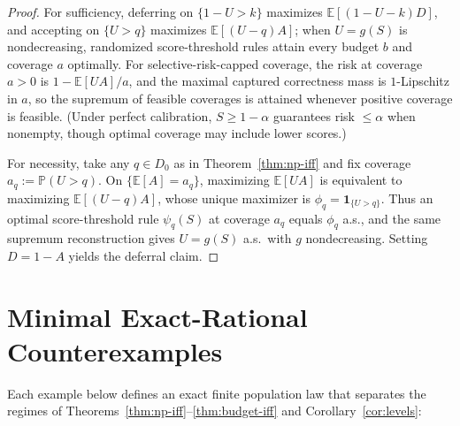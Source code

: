 \documentclass[11pt]{article}
\theoremstyle{plain}
\theoremstyle{definition}
\theoremstyle{remark}
\begin{document}
\begin{proof}
For sufficiency, deferring on $\{1 - U > k\}$ maximizes $\mathbb{E}[(1 - U - k)D]$, and accepting on $\{U > q\}$ maximizes $\mathbb{E}[(U - q)A]$; when $U = g(S)$ is nondecreasing, randomized score-threshold rules attain every budget $b$ and coverage $a$ optimally. For selective-risk-capped coverage, the risk at coverage $a > 0$ is $1 - \mathbb{E}[UA]/a$, and the maximal captured correctness mass is $1$-Lipschitz in $a$, so the supremum of feasible coverages is attained whenever positive coverage is feasible. (Under perfect calibration, $S \ge 1 - \alpha$ guarantees risk $\le \alpha$ when nonempty, though optimal coverage may include lower scores.)

For necessity, take any $q \in D_0$ as in Theorem~\ref{thm:np-iff} and fix coverage $a_q := \mathbb{P}(U > q)$. On $\{\mathbb{E}[A] = a_q\}$, maximizing $\mathbb{E}[UA]$ is equivalent to maximizing $\mathbb{E}[(U - q)A]$, whose unique maximizer is $\phi_q = \mathbf{1}_{\{U > q\}}$. Thus an optimal score-threshold rule $\psi_q(S)$ at coverage $a_q$ equals $\phi_q$ a.s., and the same supremum reconstruction gives $U = g(S)$ a.s.\ with $g$ nondecreasing. Setting $D = 1 - A$ yields the deferral claim.
\end{proof}

\section{Minimal Exact-Rational Counterexamples}

Each example below defines an exact finite population law that separates the regimes of Theorems~\ref{thm:np-iff}--\ref{thm:budget-iff} and Corollary~\ref{cor:levels}:
\end{document}
